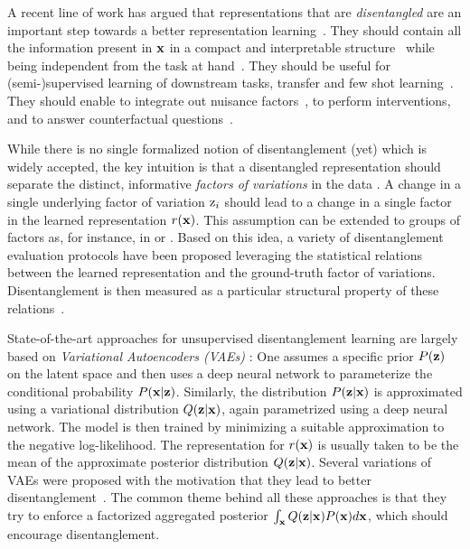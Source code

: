 \documentclass{article}
\renewcommand{\P}{P}
\newcommand{\Q}{Q}
\begin{document}
A recent line of work has argued that representations that are \emph{disentangled} are an important step towards a better representation learning~\citep{bengio2013representation,peters2017elements,lecun2015deep,bengio2007scaling,schmidhuber1992learning,lake2017building,tschannen2018recent}. They should contain all the information present in ${\mathbf{x}}$ in a compact and interpretable structure~\citep{bengio2013representation,kulkarni2015deep,chen2016infogan} while being independent from the task at hand~\citep{goodfellow2009measuring,lenc2015understanding}. 
They should be useful for (semi-)supervised learning of downstream tasks, transfer and few shot learning~\citep{bengio2013representation,scholkopf2012causal,peters2017elements}. They should enable to integrate out nuisance factors~\citep{kumar2017variational}, to perform interventions, and to answer counterfactual questions~\citep{pearl2009causality,SpiGlySch93,peters2017elements}. 

While there is no single formalized notion of disentanglement (yet) which is widely accepted, the key intuition is that a disentangled representation should separate the distinct, informative \emph{factors of variations} in the data \citep{bengio2013representation}.
A change in a single underlying factor of variation ${\textnormal{z}}_i$ should lead to a change in a single factor in the learned representation $r({\mathbf{x}})$. This assumption can be extended to groups of factors as, for instance, in \citet{bouchacourt2017multi} or \citet{suter2018interventional}. 
Based on this idea, a variety of disentanglement evaluation protocols have been proposed leveraging the statistical relations between the learned representation and the ground-truth factor of variations. 
Disentanglement is then measured as a particular structural property of these relations~\citep{higgins2016beta,kim2018disentangling,eastwood2018framework,kumar2017variational,chen2018isolating,ridgeway2018learning}.

State-of-the-art approaches for unsupervised disentanglement learning are largely based on \emph{Variational Autoencoders (VAEs)} \citep{kingma2013auto}:
One assumes a specific prior $\P(\rvz)$ on the latent space and then uses a deep neural network to parameterize the conditional probability $\P(\rvx|\rvz)$. 
Similarly, the distribution $\P(\rvz|\rvx)$ is approximated using a variational distribution  $\Q(\rvz|\rvx)$, again parametrized using a deep neural network.
The model is then trained by minimizing a suitable approximation to the negative log-likelihood. The representation for $r({\mathbf{x}})$ is usually taken to be the mean of the approximate posterior distribution $\Q(\rvz|\rvx)$. 
Several variations of VAEs were proposed with the motivation that they lead to better disentanglement~\citep{higgins2016beta,burgess2018understanding,kim2018disentangling,chen2018isolating,kumar2017variational,rubenstein2018learning}.
The common theme behind all these approaches is that they try to enforce a factorized aggregated posterior $\int_{\rvx}\Q(\rvz|\rvx)\P(\rvx)d\rvx$, which should encourage disentanglement.  
\end{document}
